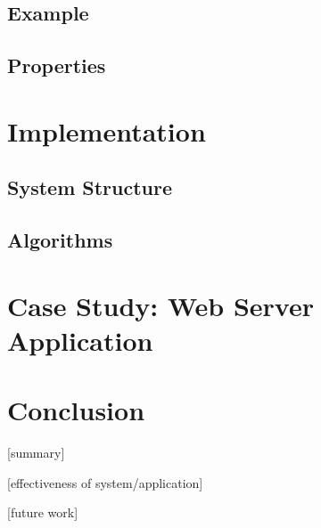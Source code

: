 \documentclass[10pt, twocolumn]{article}
\begin{document}
    \subsection{Example}

    \subsection{Properties}

  \section{Implementation}

    \subsection{System Structure}

    \subsection{Algorithms}

  \section{Case Study: Web Server Application}

  \section{Conclusion}

    [summary]

    [effectiveness of system/application]

    [future work]
\end{document}

